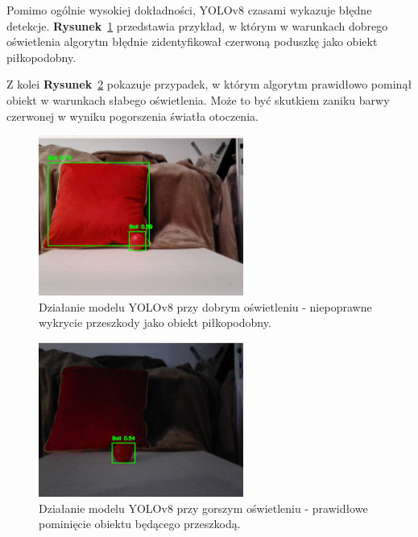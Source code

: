 \documentclass[a4paper,twoside,12pt]{book}
\begin{document}
Pomimo ogólnie wysokiej dokładności, YOLOv8 czasami wykazuje błędne detekcje. \textbf{Rysunek}~\ref{fig:yolov8_good_light_bad_object} przedstawia przykład, w którym w warunkach dobrego oświetlenia algorytm błędnie zidentyfikował czerwoną poduszkę jako obiekt piłkopodobny.

Z kolei \textbf{Rysunek}~\ref{fig:yolov8_good_light_good_object} pokazuje przypadek, w którym algorytm prawidłowo pominął obiekt w warunkach słabego oświetlenia. Może to być skutkiem zaniku barwy czerwonej w wyniku pogorszenia światła otoczenia.

\begin{figure}[h]
    \centering
    \includegraphics[width=0.6\textwidth]{Images/Porownanie/Yolo 8 laptop/Zrzut ekranu 2025-01-02 194808.png}
    \caption{Działanie modelu YOLOv8 przy dobrym oświetleniu - niepoprawne wykrycie przeszkody jako obiekt piłkopodobny.}
    \label{fig:yolov8_good_light_bad_object}
\end{figure}

\begin{figure}[h]
    \centering
    \includegraphics[width=0.6\textwidth]{Images/Porownanie/Yolo 8 laptop/Zrzut ekranu 2025-01-02 194704.png}
    \caption{Działanie modelu YOLOv8 przy gorszym oświetleniu - prawidłowe pominięcie obiektu będącego przeszkodą.}
    \label{fig:yolov8_good_light_good_object}
\end{figure}
\end{document}
